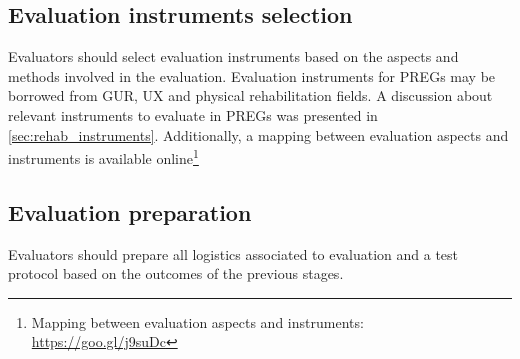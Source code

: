 \begin{table}[htb]
\caption{Evaluation methods for the game system layer over time}
\label{tab:methodsModelMappingGame}
\myfloatalign
{}
\end{table}

\subsection{Evaluation instruments selection}
Evaluators should select evaluation instruments based on the aspects and methods involved in the evaluation. Evaluation instruments for \acp{PREG} may be borrowed from \ac{GUR}, \ac{UX} and physical rehabilitation fields. A discussion about relevant instruments to evaluate in \acp{PREG} was presented in \autoref{sec:rehab_instruments}. Additionally, a mapping between evaluation aspects and instruments is available online\footnote{Mapping between evaluation aspects and instruments: \url{https://goo.gl/j9suDc}}

\subsection{Evaluation preparation}
Evaluators should prepare all logistics associated to evaluation and a test protocol based on the outcomes of the previous stages.

